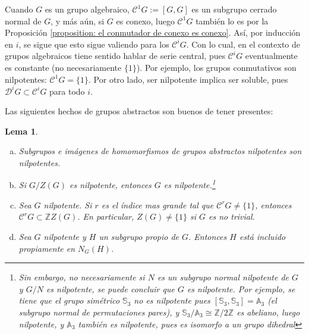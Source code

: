 \documentclass[spanish,10pt]{amsart}
\newtheorem{lemma}[theorem]{Lema}
\theoremstyle{definition}
\theoremstyle{remark}
\numberwithin{equation}{section}
\newcommand{\integers}{\mathbb{Z}}
\begin{document}
Cuando $G$ es un grupo algebraico, $\mathcal C^1 G := [G,G]$ es un subgrupo cerrado normal de $G$, y más aún, si $G$ es conexo, luego $\mathcal C^1 G$ también lo es por la Proposición \ref{proposition: el conmutador de conexo es conexo}. Así, por inducción en $i$, se sigue que esto sigue valiendo para los $\mathcal C^i G$. Con lo cual, en el contexto de grupos algebraicos tiene sentido hablar de serie central, pues $\mathcal C^i G$ eventualmente es constante (no necesariamente $\{1\}$). Por ejemplo, los grupos conmutativos son nilpotentes: $\mathcal C^1 G = \{1\}$. Por otro lado, ser nilpotente implica ser soluble, pues $\mathcal D^i G \subset \mathcal C^i G$ para todo $i$.

Las siguientes hechos de grupos abstractos son buenos de tener presentes:
\begin{lemma}\label{lema:hechos generales de teoria de grupos}
\begin{enumerate}[(a)]
\item Subgrupos e imágenes de homomorfismos de grupos abstractos nilpotentes son nilpotentes.
\item Si $G/Z(G)$ es nilpotente, entonces $G$ es nilpotente.\footnote{Sin embargo, no necesariamente si $N$ es un subgrupo normal nilpotente de $G$ y $G/N$ es nilpotente, se puede concluir que $G$ es nilpotente. Por ejemplo, se tiene que el grupo simétrico $\mathbb{S}_3$ no es nilpotente pues $[\mathbb{S}_3, \mathbb{S}_3] = \mathbb A_3$ (el subgrupo normal de permutaciones pares), y $\mathbb{S}_3 / \mathbb{A}_3 \cong \integers /2 \integers$ es abeliano, luego nilpotente, y $\mathbb{A}_3$ también es nilpotente, pues es isomorfo a un grupo dihedral}
\item Sea $G$ nilpotente. Si $r$ es el índice mas grande tal que $\mathcal C^r G \neq \{1\}$, entonces $\mathcal C^r G \subset \integers Z(G)$. En particular, $Z(G) \neq \{1\}$ si $G$ es no trivial.
\item Sea $G$ nilpotente y $H$ un subgrupo propio de $G$. Entonces $H$ está incluido propiamente en $N_G (H)$.
\end{enumerate}
\end{lemma}
\end{document}
